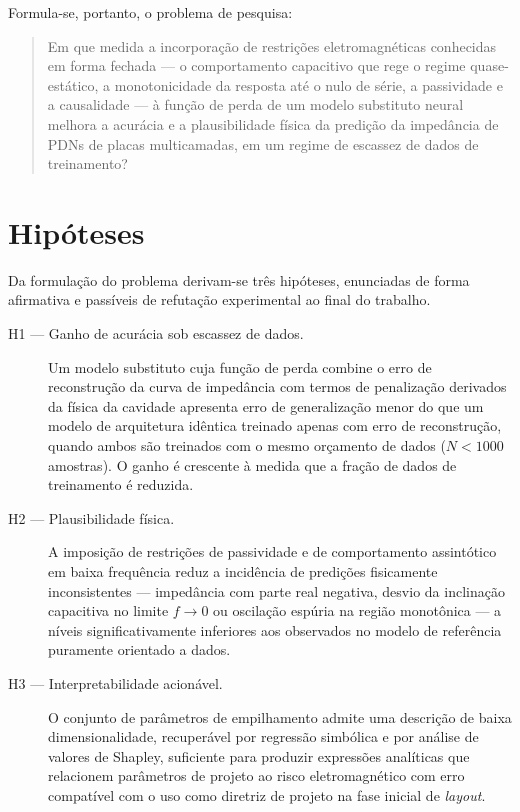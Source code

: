 Formula-se, portanto, o problema de pesquisa:

\begin{quote}
Em que medida a incorporação de restrições eletromagnéticas conhecidas em forma
fechada — o comportamento capacitivo que rege o regime quase-estático, a
monotonicidade da resposta até o nulo de série, a passividade e a causalidade —
à função de perda de um modelo substituto neural melhora a acurácia e a
plausibilidade física da predição da impedância de PDNs de placas multicamadas,
em um regime de escassez de dados de treinamento?
\end{quote}

\section{Hipóteses}
\label{sec:hipoteses}

Da formulação do problema derivam-se três hipóteses, enunciadas de forma
afirmativa e passíveis de refutação experimental ao final do trabalho.

\begin{description}
\item[H1 --- Ganho de acurácia sob escassez de dados.] Um modelo substituto cuja
função de perda combine o erro de reconstrução da curva de impedância com termos
de penalização derivados da física da cavidade apresenta erro de generalização
menor do que um modelo de arquitetura idêntica treinado apenas com erro de
reconstrução, quando ambos são treinados com o mesmo orçamento de dados
($N < 1000$ amostras). O ganho é crescente à medida que a fração de dados de
treinamento é reduzida.

\item[H2 --- Plausibilidade física.] A imposição de restrições de passividade e
de comportamento assintótico em baixa frequência reduz a incidência de predições
fisicamente inconsistentes — impedância com parte real negativa, desvio da
inclinação capacitiva no limite $f \rightarrow 0$ ou oscilação espúria na região
monotônica — a níveis significativamente inferiores aos observados no modelo de
referência puramente orientado a dados.

\item[H3 --- Interpretabilidade acionável.] O conjunto de parâmetros de
empilhamento admite uma descrição de baixa dimensionalidade, recuperável por
regressão simbólica e por análise de valores de Shapley, suficiente para produzir
expressões analíticas que relacionem parâmetros de projeto ao risco
eletromagnético com erro compatível com o uso como diretriz de projeto na fase
inicial de \textit{layout}.
\end{description}

